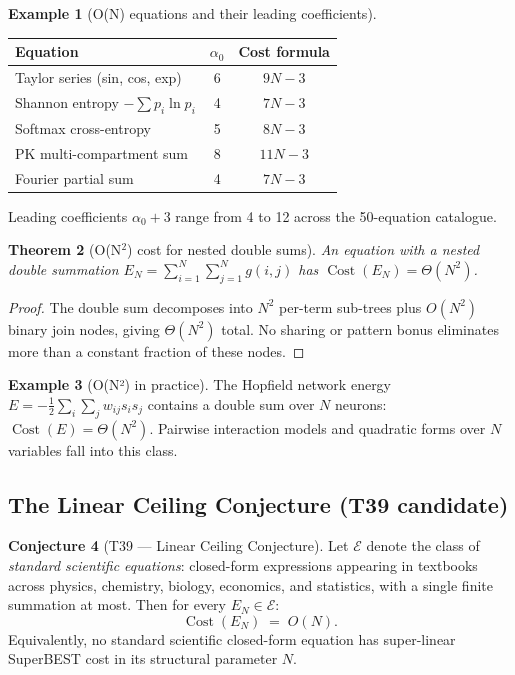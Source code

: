 \documentclass[12pt,a4paper]{article}
\newtheorem{theorem}{Theorem}[section]
\theoremstyle{definition}
\newtheorem{conjecture}[theorem]{Conjecture}
\newtheorem{example}[theorem]{Example}
\newcommand{\Cost}{\operatorname{Cost}}
\begin{document}
\begin{example}[O(N) equations and their leading coefficients]
\label{ex:ON}
\begin{center}
\begin{tabular}{@{}lcc@{}}
\toprule
\textbf{Equation} & $\alpha_0$ & \textbf{Cost formula} \\
\midrule
Taylor series (sin, cos, exp)   & 6  & $9N - 3$ \\
Shannon entropy $-\sum p_i \ln p_i$ & 4  & $7N - 3$ \\
Softmax cross-entropy           & 5  & $8N - 3$ \\
PK multi-compartment sum        & 8  & $11N - 3$ \\
Fourier partial sum             & 4  & $7N - 3$ \\
\bottomrule
\end{tabular}
\end{center}
Leading coefficients $\alpha_0 + 3$ range from 4 to 12 across the 50-equation
catalogue.
\end{example}

\begin{theorem}[O(N\texorpdfstring{$^2$}{²}) cost for nested double sums]
\label{thm:ON2}
An equation with a nested double summation
$E_{N} = \sum_{i=1}^{N}\sum_{j=1}^{N} g(i,j)$
has $\Cost(E_N) = \Theta(N^2)$.
\end{theorem}

\begin{proof}
The double sum decomposes into $N^2$ per-term sub-trees plus $O(N^2)$ binary
join nodes, giving $\Theta(N^2)$ total.  No sharing or pattern bonus
eliminates more than a constant fraction of these nodes.
\end{proof}

\begin{example}[O(N²) in practice]
The Hopfield network energy $E = -\frac{1}{2}\sum_{i}\sum_{j} w_{ij} s_i s_j$
contains a double sum over $N$ neurons: $\Cost(E) = \Theta(N^2)$.  Pairwise
interaction models and quadratic forms over $N$ variables fall into this class.
\end{example}

\subsection{The Linear Ceiling Conjecture (T39 candidate)}

\begin{conjecture}[T39 --- Linear Ceiling Conjecture]
\label{conj:T39}
Let $\mathcal{E}$ denote the class of \emph{standard scientific equations}:
closed-form expressions appearing in textbooks across physics, chemistry,
biology, economics, and statistics, with a single finite summation at most.
Then for every $E_N \in \mathcal{E}$:
\[
  \Cost(E_N) \;=\; O(N).
\]
Equivalently, no standard scientific closed-form equation has super-linear
SuperBEST cost in its structural parameter $N$.
\end{conjecture}
\end{document}
